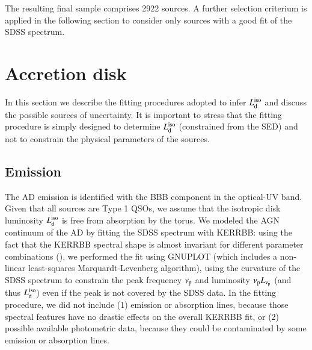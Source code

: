 \documentclass[]{aa}
\begin{document}
\begin{itemize}
\end{itemize}

The resulting final sample comprises 2922 sources. A further selection criterium is applied in the following section to consider only sources with a good fit of the SDSS spectrum.



















\section{Accretion disk}\label{DISK}

In this section we describe the fitting procedures adopted to infer $L^{\rm iso}_{\rm d}$ and discuss the possible sources of uncertainty. It is important to stress that the fitting procedure is simply designed to determine $L^{\rm iso}_{\rm d}$ (constrained from the SED) and not to constrain the physical parameters of the sources.






\subsection{Emission}\label{ADemission}

The AD emission is identified with the BBB component in the optical-UV band. Given that all sources are Type 1 QSOs, we assume that the isotropic disk luminosity $L^{\rm iso}_{\rm d}$ is free from absorption by the torus. We modeled the AGN continuum of the AD by fitting the SDSS spectrum with KERRBB: using the fact that the KERRBB spectral shape is almost invariant for different parameter combinations (\citealt{Campiti}), we performed the fit using GNUPLOT (which includes a non-linear least-squares Marquardt-Levenberg algorithm), using the curvature of the SDSS spectrum to constrain the peak frequency $\nu_{\rm p}$ and luminosity $\nu_{\rm p}L_{\nu_{\rm p}}$ (and thus $L^{\rm iso}_{\rm d}$) even if the peak is not covered by the SDSS data. In the fitting procedure, we did not include (1) emission or absorption lines, because those spectral features have no drastic effects on the overall KERRBB fit, or (2) possible available photometric data, because they could be contaminated by some emission or absorption lines.
\end{document}
